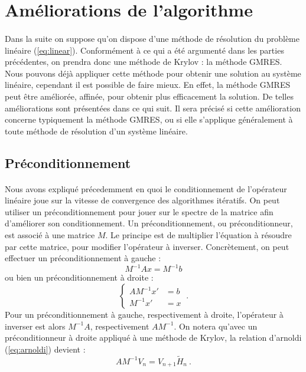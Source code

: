 \section{Améliorations de l’algorithme}

	\paragraph{}
	Dans la suite on suppose qu'on dispose d'une méthode de résolution du problème linéaire (\ref{eq:linear}).
	Conformément à ce qui a été argumenté dans les parties précédentes, on prendra donc une méthode de Krylov : la méthode GMRES.
	Nous pouvons déjà appliquer cette méthode pour obtenir une solution au système linéaire, cependant il est possible de faire mieux.
	En effet, la méthode GMRES peut être améliorée, affinée, pour obtenir plus efficacement la solution.
	De telles améliorations sont présentées dans ce qui suit.
	Il sera précisé si cette amélioration concerne typiquement la méthode GMRES, ou si elle s'applique généralement à toute méthode de résolution d'un système linéaire.


	\subsection{Préconditionnement}

		\paragraph{}
		Nous avons expliqué précedemment en quoi le conditionnement de l'opérateur linéaire joue sur la vitesse de convergence des algorithmes itératifs.
		On peut utiliser un préconditionnement pour jouer sur le spectre de la matrice afin d'améliorer son conditionnement.
		Un préconditionnement, ou préconditionneur, est associé à une matrice $M$.
		Le principe est de multiplier l'équation à résoudre par cette matrice, pour modifier l'opérateur à inverser.
		Concrètement, on peut effectuer un préconditionnement à gauche :
		\[M^{-1}Ax = M^{-1}b\]
		ou bien un préconditionnement à droite :
		\[\left\{\begin{aligned}AM^{-1}x' &= b \\	M^{-1}x' &= x\end{aligned}\right.\ .\]
		Pour un préconditionnement à gauche, respectivement à droite, l'opérateur à inverser est alors $M^{-1}A$, respectivement $AM^{-1}$.
    On notera qu'avec un préconditionneur à droite appliqué à une méthode de Krylov, la relation d'arnoldi (\ref{eq:arnoldi}) devient :
    \begin{equation}\label{eq:arnoldi_pre}
      AM^{-1}V_n = V_{n+1}\widetilde{H}_n\ .
    \end{equation}

